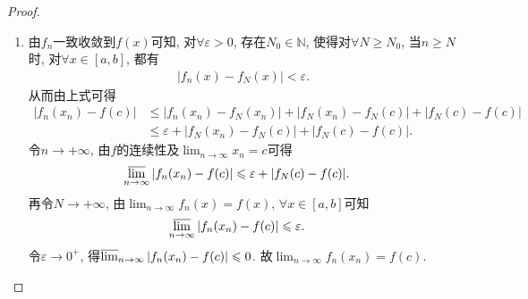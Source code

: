 \documentclass[../../main.tex]{subfiles}%
\begin{document}
\begin{proof}
\begin{enumerate}
\item 由\(f_n\)一致收敛到\(f(x)\)可知, 对\(\forall \varepsilon > 0\), 存在\(N_0\in \mathbb{N}\), 使得对\(\forall N\geqslant N_0\), 当\(n\geqslant N\)时, 对\(\forall x\in [a,b]\), 都有
\begin{align*}
|f_n(x) - f_N(x)| < \varepsilon.
\end{align*}
从而由上式可得
\begin{align*}
|f_n(x_n) - f(c)| &\leqslant |f_n(x_n) - f_N(x_n)| + |f_N(x_n) - f_N(c)| + |f_N(c) - f(c)|\\
&\leqslant \varepsilon + |f_N(x_n) - f_N(c)| + |f_N(c) - f(c)|.
\end{align*}
令\(n\rightarrow +\infty\), 由\(f\)的连续性及\(\lim_{n\rightarrow \infty}x_n = c\)可得
\begin{align*}
\varlimsup_{n\rightarrow \infty}|f_n(x_n) - f(c)| &\leqslant \varepsilon + |f_N(c) - f(c)|.
\end{align*}
再令\(N\rightarrow +\infty\), 由\(\lim_{n\rightarrow \infty}f_n(x) = f(x)\), \(\forall x\in [a,b]\)可知
\begin{align*}
\varlimsup_{n\rightarrow \infty}|f_n(x_n) - f(c)| &\leqslant \varepsilon.
\end{align*}
令\(\varepsilon \rightarrow 0^+\), 得\(\varlimsup_{n\rightarrow \infty}|f_n(x_n) - f(c)| \leqslant 0\). 故\(\lim_{n\rightarrow \infty}f_n(x_n) = f(c)\). 


\end{enumerate}
\end{proof}
\end{document}
